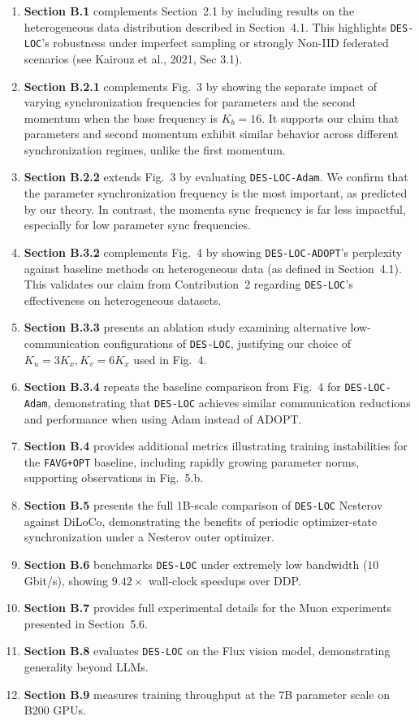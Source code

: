 \begin{enumerate}
\item \textbf{Section B.1} complements Section~2.1 by including results on the heterogeneous data distribution described in Section~4.1. This highlights \texttt{DES-LOC}'s robustness under imperfect sampling or strongly Non-IID federated scenarios (see Kairouz et al., 2021, Sec 3.1).
\item \textbf{Section B.2.1} complements Fig.~3 by showing the separate impact of varying synchronization frequencies for parameters and the second momentum when the base frequency is $K_b=16$. It supports our claim that parameters and second momentum exhibit similar behavior across different synchronization regimes, unlike the first momentum.
\item \textbf{Section B.2.2} extends Fig.~3 by evaluating \texttt{DES-LOC-Adam}. We confirm that the parameter synchronization frequency is the most important, as predicted by our theory. In contrast, the momenta sync frequency is far less impactful, especially for low parameter sync frequencies.
\item \textbf{Section B.3.2} complements Fig.~4 by showing \texttt{DES-LOC-ADOPT}'s perplexity against baseline methods on heterogeneous data (as defined in Section~4.1). This validates our claim from Contribution~2 regarding \texttt{DES-LOC}'s effectiveness on heterogeneous datasets.
\item \textbf{Section B.3.3} presents an ablation study examining alternative low-communication configurations of \texttt{DES-LOC}, justifying our choice of $K_u=3K_x, K_v=6K_x$ used in Fig.~4.
\item \textbf{Section B.3.4} repeats the baseline comparison from Fig.~4 for \texttt{DES-LOC-Adam}, demonstrating that \texttt{DES-LOC} achieves similar communication reductions and performance when using Adam instead of ADOPT.
\item \textbf{Section B.4} provides additional metrics illustrating training instabilities for the \texttt{FAVG+OPT} baseline, including rapidly growing parameter norms, supporting observations in Fig.~5.b.
\item \textbf{Section B.5} presents the full 1B-scale comparison of \texttt{DES-LOC} Nesterov against DiLoCo, demonstrating the benefits of periodic optimizer-state synchronization under a Nesterov outer optimizer.
\item \textbf{Section B.6} benchmarks \texttt{DES-LOC} under extremely low bandwidth ($10$ Gbit/s), showing $9.42\times$ wall-clock speedups over DDP.
\item \textbf{Section B.7} provides full experimental details for the Muon experiments presented in Section~5.6.
\item \textbf{Section B.8} evaluates \texttt{DES-LOC} on the Flux vision model, demonstrating generality beyond LLMs.
\item \textbf{Section B.9} measures training throughput at the $7$B parameter scale on B200 GPUs.
\end{enumerate}

